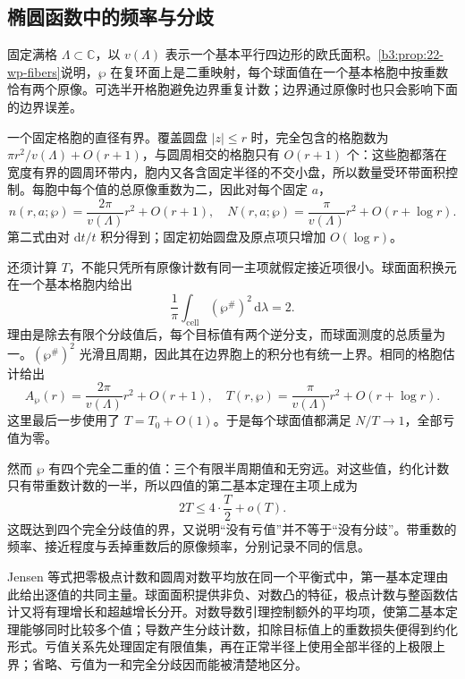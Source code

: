 \subsection{椭圆函数中的频率与分歧}
\label{b3:subsec:C0404}

固定满格 \(\Lambda\subset\mathbb C\)，以 \(v(\Lambda)\) 表示一个基本平行四边形的欧氏面积。\cref{b3:prop:22-wp-fibers}说明，\(\wp\) 在复环面上是二重映射，每个球面值在一个基本格胞中按重数恰有两个原像。可选半开格胞避免边界重复计数；边界通过原像时也只会影响下面的边界误差。

\ProseParagraphBreak

一个固定格胞的直径有界。覆盖圆盘 \(|z|\le r\) 时，完全包含的格胞数为 \(\pi r^2/v(\Lambda)+O(r+1)\)，与圆周相交的格胞只有 \(O(r+1)\) 个：这些胞都落在宽度有界的圆周环带内，胞内又各含固定半径的不交小盘，所以数量受环带面积控制。每胞中每个值的总原像重数为二，因此对每个固定 \(a\)，
\[
 n(r,a;\wp)=\frac{2\pi}{v(\Lambda)}r^2+O(r+1),
 \quad N(r,a;\wp)=\frac\pi{v(\Lambda)}r^2+O(r+\log r).
\]
第二式由对 \(\mathrm{d}t/t\) 积分得到；固定初始圆盘及原点项只增加 \(O(\log r)\)。

\ProseParagraphBreak

还须计算 \(T\)，不能只凭所有原像计数有同一主项就假定接近项很小。球面面积换元在一个基本格胞内给出
\[
 \frac1\pi\int_{\mathrm{cell}}(\wp^\#)^2\,\mathrm{d}\lambda=2.
\]
理由是除去有限个分歧值后，每个目标值有两个逆分支，而球面测度的总质量为一。\((\wp^\#)^2\) 光滑且周期，因此其在边界胞上的积分也有统一上界。相同的格胞估计给出
\[
 A_\wp(r)=\frac{2\pi}{v(\Lambda)}r^2+O(r+1),
 \quad T(r,\wp)=\frac\pi{v(\Lambda)}r^2+O(r+\log r).
\]
这里最后一步使用了 \(T=T_0+O(1)\)。于是每个球面值都满足 \(N/T\to1\)，全部亏值为零。

\ProseParagraphBreak

然而 \(\wp\) 有四个完全二重的值：三个有限半周期值和无穷远。对这些值，约化计数只有带重数计数的一半，所以四值的第二基本定理在主项上成为
\[
 2T\le4\cdot\frac T2+o(T).
\]
这既达到四个完全分歧值的界，又说明“没有亏值”并不等于“没有分歧”。带重数的频率、接近程度与丢掉重数后的原像频率，分别记录不同的信息。

\begin{chaptersummary}
Jensen 等式把零极点计数和圆周对数平均放在同一个平衡式中，第一基本定理由此给出逐值的共同主量。球面面积提供非负、对数凸的特征，极点计数与整函数估计又将有理增长和超越增长分开。对数导数引理控制额外的平均项，使第二基本定理能够同时比较多个值；导数产生分歧计数，扣除目标值上的重数损失便得到约化形式。亏值关系先处理固定有限值集，再在正常半径上使用全部半径的上极限上界；省略、亏值为一和完全分歧因而能被清楚地区分。
\end{chaptersummary}
\BookExercises

